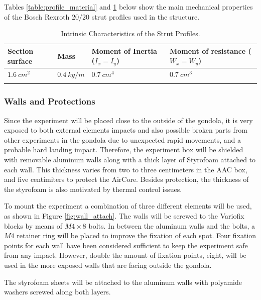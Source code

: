 \documentclass[a4paper,12pt,twoside]{article}
\begin{document}
\bigskip
Tables \ref{table:profile_material} and \ref{table:profile_momentum} below show the main mechanical properties of the Bosch Rexroth $20/20$ strut profiles used in the structure.


\begin{longtable}{|m{}|m{}|m{}|m{}|}
\hline
\textbf{Section surface} & \textbf{Mass} & \textbf{Moment of Inertia ($I_x = I_y$)} & \textbf{Moment of resistance ($W_x = W_y$)} \\ \hline 
$1.6\ cm^2$ & $0.4\ kg/m$ & $0.7\ cm^4$ & $0.7\ cm^3$ \\ \hline

\caption{Intrinsic Characteristics of the Strut Profiles.}
\label{table:profile_momentum}
\end{longtable}

\smallskip

\subsubsection{Walls and Protections}
\label{sec:4.4.2}

Since the experiment will be placed close to the outside of the gondola, it is very exposed to both external elements impacts and also possible broken parts from other experiments in the gondola due to unexpected rapid movements, and a probable hard landing impact. Therefore, the experiment box will be shielded with removable aluminum walls along with a thick layer of Styrofoam attached to each wall. This thickness varies from two to three centimeters in the AAC box, and five centimiters to protect the AirCore. Besides protection, the thickness of the styrofoam is also motivated by thermal control issues.

To mount the experiment a combination of three different elements will be used, as shown in Figure \ref{fig:wall_attach}. The walls will be screwed to the Variofix blocks by means of $M4\times8$ bolts. In between the aluminum walls and the bolts, a $M4$ retainer ring will be placed to improve the fixation of each spot. Four fixation points for each wall have been considered sufficient to keep the experiment safe from any impact. However, double the amount of fixation points, eight, will be used in the more exposed walls that are facing outside the gondola.

The styrofoam sheets will be attached to the aluminum walls with polyamide washers screwed along both layers.
\end{document}
